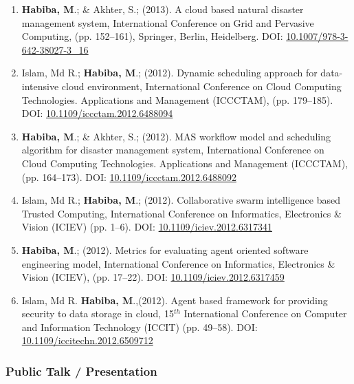 \documentclass[12pt,parskip=half]{scrartcl}
\begin{document}
\begin{enumerate}
  \item \textbf{Habiba, M}.; \& Akhter, S.; (2013). A cloud based natural disaster management system, International Conference on Grid and Pervasive Computing, (pp. 152--161), Springer, Berlin, Heidelberg. DOI: \href{https://doi.org/10.1007/978-3-642-38027-3\_16  }{10.1007/978-3-642-38027-3\_16}
   
   \item Islam, Md R.; \textbf{Habiba, M}.; (2012). Dynamic scheduling approach for data-intensive cloud environment, International Conference on Cloud Computing Technologies. Applications and Management (ICCCTAM), (pp. 179--185). DOI: \href{ https://doi.org/10.1109/iccctam.2012.6488094  }{10.1109/iccctam.2012.6488094}
  
  
  \item \textbf{Habiba, M}.; \& Akhter, S.; (2012). MAS workflow model and scheduling algorithm for disaster management system, International Conference on Cloud Computing Technologies. Applications and Management (ICCCTAM), (pp. 164--173). DOI: \href{https://doi.org/10.1109/iccctam.2012.6488092 }{10.1109/iccctam.2012.6488092}

    \item Islam, Md R.; \textbf{Habiba, M}.; (2012). Collaborative swarm intelligence based Trusted Computing, International Conference on Informatics, Electronics \& Vision (ICIEV) (pp. 1--6). DOI: \href{https://doi.org/10.1109/iciev.2012.6317341  }{10.1109/iciev.2012.6317341 }

 \item \textbf{Habiba, M}.; (2012). Metrics for evaluating agent oriented software engineering model, International Conference on Informatics, Electronics \& Vision (ICIEV), (pp. 17--22). DOI: \href{ https://doi.org/10.1109/iciev.2012.6317459 }{10.1109/iciev.2012.6317459 }
 
  \item Islam, Md R. \textbf{Habiba, M}.,(2012). Agent based framework for providing security to data storage in cloud, 15$^{th}$ International Conference on Computer and Information Technology (ICCIT) (pp. 49--58). DOI: \href{https://doi.org/10.1109/iccitechn.2012.6509712 }{10.1109/iccitechn.2012.6509712 }

\end{enumerate}



 \subsubsection{ Public Talk / Presentation}\label{theses-and-dissertations}
\end{document}
